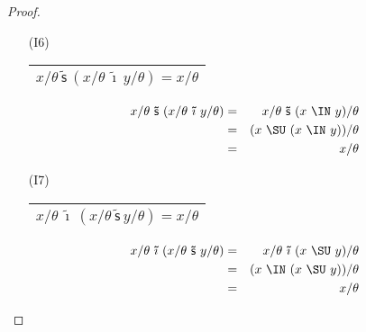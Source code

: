\begin{proof}
\begin{multicols}{2}
\begin{enumerate}
        \item[(I6)] \begin{tabular}{|c|} \hline $x/\theta \ \mathsf{\tilde{s}} \ (x/\theta \ \mathsf{\tilde{\imath}} \
          y/\theta) = x/\theta$ \\\hline \end{tabular}
          \begin{eqnarray*}
            x/\theta \ \mathsf{\tilde{s}} \ (x/\theta \ \mathsf{\tilde{\imath}} \ y/\theta) &=& x/\theta \ \mathsf{\tilde{s}}
              \ (x \ \IN \ y)/\theta \\
            &=& (x \ \SU \ (x \ \IN \ y))/\theta \\
            &=& x/\theta
          \end{eqnarray*}
        \item[(I7)] \begin{tabular}{|c|} \hline $x/\theta \ \mathsf{\tilde{\imath}} \ (x/\theta \ \mathsf{\tilde{s}} \
          y/\theta) = x/\theta$ \\\hline \end{tabular}
          \begin{eqnarray*}
            x/\theta \ \mathsf{\tilde{\imath}} \ (x/\theta \ \mathsf{\tilde{s}} \ y/\theta) &=& x/\theta \
              \mathsf{\tilde{\imath}} \ (x \ \SU \ y)/\theta \\
            &=& (x \ \IN \ (x \ \SU \ y))/\theta \\
            &=& x/\theta
          \end{eqnarray*}
      \end{enumerate}
    \end{multicols}
  \end{proof}

